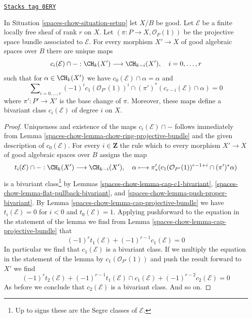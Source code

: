 \begin{lemma}
\label{spaces-chow-lemma-segre-classes}
\href{https://stacks.math.columbia.edu/tag/0ERY}{\texttt{Stacks tag 0ERY}}

In Situation \ref{spaces-chow-situation-setup} let $X/B$ be good.
Let $\mathcal{E}$ be a finite locally free sheaf of rank $r$ on $X$.
Let $(\pi : P \to X, \mathcal{O}_P(1))$ be the projective space
bundle associated to $\mathcal{E}$. For every
morphism $X' \to X$ of good algebraic spaces over $B$
there are unique maps
$$
c_i(\mathcal{E}) \cap - : \CH_k(X') \longrightarrow \CH_{k - i}(X'),\quad
i = 0, \ldots, r
$$
such that for $\alpha \in \CH_k(X')$ we have
$c_0(\mathcal{E}) \cap \alpha = \alpha$ and
$$
\sum\nolimits_{i = 0, \ldots, r}
(-1)^i c_1(\mathcal{O}_{P'}(1))^i \cap
(\pi')^*\left(c_{r - i}(\mathcal{E}) \cap \alpha\right) = 0
$$
where $\pi' : P' \to X'$ is the base change of $\pi$.
Moreover, these maps define a bivariant class
$c_i(\mathcal{E})$ of degree $i$ on $X$.
\end{lemma}

\begin{proof}
Uniqueness and existence of the maps $c_i(\mathcal{E}) \cap -$
follows immediately from Lemma \ref{spaces-chow-lemma-chow-ring-projective-bundle}
and the given description of $c_0(\mathcal{E})$. For every $i \in \mathbf{Z}$
the rule which to every morphism $X' \to X$ of good algebraic spaces
over $B$ assigns the map
$$
t_i(\mathcal{E}) \cap - :
\CH_k(X') \longrightarrow \CH_{k - i}(X'),\quad
\alpha \longmapsto
\pi'_*(c_1(\mathcal{O}_{P'}(1))^{r - 1 + i} \cap (\pi')^*\alpha)
$$
is a bivariant class\footnote{Up to signs these are
the Segre classes of $\mathcal{E}$.} by Lemmas \ref{spaces-chow-lemma-cap-c1-bivariant},
\ref{spaces-chow-lemma-flat-pullback-bivariant}, and
\ref{spaces-chow-lemma-push-proper-bivariant}.
By Lemma \ref{spaces-chow-lemma-cap-projective-bundle} we have
$t_i(\mathcal{E}) = 0$ for $i < 0$ and $t_0(\mathcal{E}) = 1$.
Applying pushforward to the equation in the statement of the lemma
we find from Lemma \ref{spaces-chow-lemma-cap-projective-bundle} that
$$
(-1)^r t_1(\mathcal{E}) + (-1)^{r - 1}c_1(\mathcal{E}) = 0
$$
In particular we find that $c_1(\mathcal{E})$ is a bivariant class.
If we multiply the equation in the statement of the lemma by
$c_1(\mathcal{O}_{P'}(1))$ and push the result forward to $X'$
we find
$$
(-1)^r t_2(\mathcal{E}) +
(-1)^{r - 1} t_1(\mathcal{E}) \cap c_1(\mathcal{E}) +
(-1)^{r - 2} c_2(\mathcal{E}) = 0
$$
As before we conclude that $c_2(\mathcal{E})$ is a bivariant class.
And so on.
\end{proof}

